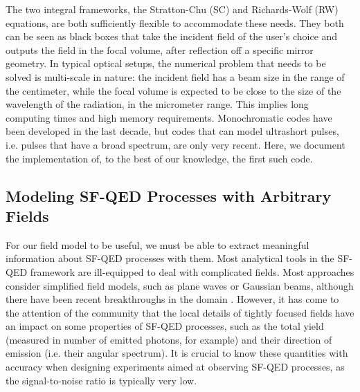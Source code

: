 \documentclass[11pt,SymmetricalJury]{inrsthesis/inrsthesis}
\begin{document}
The two integral frameworks, the Stratton-Chu (SC) and Richards-Wolf (RW)
equations, are both sufficiently flexible to accommodate these needs. They both
can be seen as black boxes that take the incident field of the user's choice and
outputs the field in the focal volume, after reflection off a specific mirror
geometry. In typical optical setups, the numerical problem that needs to be
solved is multi-scale in nature: the incident field has a beam size in the range
of the centimeter, while the focal volume is expected to be close to the size of
the wavelength of the radiation, in the micrometer range. This implies long
computing times and high memory requirements. Monochromatic codes have been
developed in the last decade, but codes that can model ultrashort pulses, i.e.
pulses that have a broad spectrum, are only very recent. Here, we document the
implementation of, to the best of our knowledge, the first such code.



\subsection{Modeling SF-QED Processes with Arbitrary Fields}

For our field model to be useful, we must be able to extract meaningful
information about SF-QED processes with them. Most analytical tools in the
SF-QED framework are ill-equipped to deal with complicated fields. Most
approaches consider simplified field models, such as plane waves or Gaussian
beams, although there have been recent breakthroughs in the domain
\cite{DIPIAZZA}. However, it has
come to the attention of the community that the local details of tightly focused
fields have an impact on some properties of SF-QED processes, such as the total
yield (measured in number of emitted photons, for example) and their direction
of emission (i.e. their angular spectrum). It is crucial to know these quantities
with accuracy when designing experiments aimed at observing SF-QED processes,
as the signal-to-noise ratio is typically very low.
\end{document}
